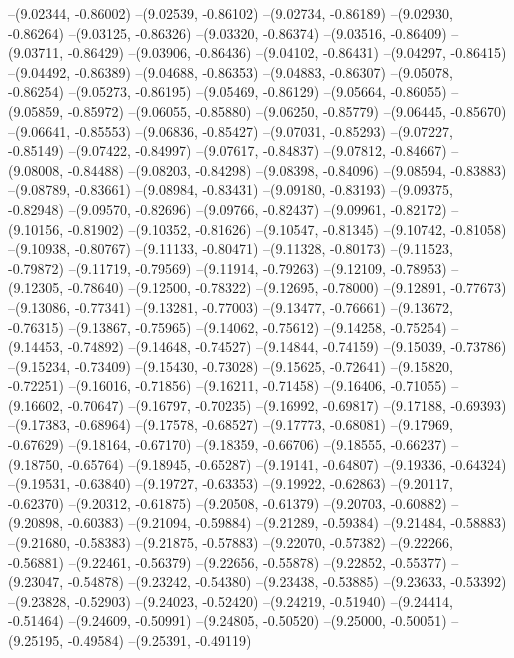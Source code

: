 --(9.02344, -0.86002)
--(9.02539, -0.86102)
--(9.02734, -0.86189)
--(9.02930, -0.86264)
--(9.03125, -0.86326)
--(9.03320, -0.86374)
--(9.03516, -0.86409)
--(9.03711, -0.86429)
--(9.03906, -0.86436)
--(9.04102, -0.86431)
--(9.04297, -0.86415)
--(9.04492, -0.86389)
--(9.04688, -0.86353)
--(9.04883, -0.86307)
--(9.05078, -0.86254)
--(9.05273, -0.86195)
--(9.05469, -0.86129)
--(9.05664, -0.86055)
--(9.05859, -0.85972)
--(9.06055, -0.85880)
--(9.06250, -0.85779)
--(9.06445, -0.85670)
--(9.06641, -0.85553)
--(9.06836, -0.85427)
--(9.07031, -0.85293)
--(9.07227, -0.85149)
--(9.07422, -0.84997)
--(9.07617, -0.84837)
--(9.07812, -0.84667)
--(9.08008, -0.84488)
--(9.08203, -0.84298)
--(9.08398, -0.84096)
--(9.08594, -0.83883)
--(9.08789, -0.83661)
--(9.08984, -0.83431)
--(9.09180, -0.83193)
--(9.09375, -0.82948)
--(9.09570, -0.82696)
--(9.09766, -0.82437)
--(9.09961, -0.82172)
--(9.10156, -0.81902)
--(9.10352, -0.81626)
--(9.10547, -0.81345)
--(9.10742, -0.81058)
--(9.10938, -0.80767)
--(9.11133, -0.80471)
--(9.11328, -0.80173)
--(9.11523, -0.79872)
--(9.11719, -0.79569)
--(9.11914, -0.79263)
--(9.12109, -0.78953)
--(9.12305, -0.78640)
--(9.12500, -0.78322)
--(9.12695, -0.78000)
--(9.12891, -0.77673)
--(9.13086, -0.77341)
--(9.13281, -0.77003)
--(9.13477, -0.76661)
--(9.13672, -0.76315)
--(9.13867, -0.75965)
--(9.14062, -0.75612)
--(9.14258, -0.75254)
--(9.14453, -0.74892)
--(9.14648, -0.74527)
--(9.14844, -0.74159)
--(9.15039, -0.73786)
--(9.15234, -0.73409)
--(9.15430, -0.73028)
--(9.15625, -0.72641)
--(9.15820, -0.72251)
--(9.16016, -0.71856)
--(9.16211, -0.71458)
--(9.16406, -0.71055)
--(9.16602, -0.70647)
--(9.16797, -0.70235)
--(9.16992, -0.69817)
--(9.17188, -0.69393)
--(9.17383, -0.68964)
--(9.17578, -0.68527)
--(9.17773, -0.68081)
--(9.17969, -0.67629)
--(9.18164, -0.67170)
--(9.18359, -0.66706)
--(9.18555, -0.66237)
--(9.18750, -0.65764)
--(9.18945, -0.65287)
--(9.19141, -0.64807)
--(9.19336, -0.64324)
--(9.19531, -0.63840)
--(9.19727, -0.63353)
--(9.19922, -0.62863)
--(9.20117, -0.62370)
--(9.20312, -0.61875)
--(9.20508, -0.61379)
--(9.20703, -0.60882)
--(9.20898, -0.60383)
--(9.21094, -0.59884)
--(9.21289, -0.59384)
--(9.21484, -0.58883)
--(9.21680, -0.58383)
--(9.21875, -0.57883)
--(9.22070, -0.57382)
--(9.22266, -0.56881)
--(9.22461, -0.56379)
--(9.22656, -0.55878)
--(9.22852, -0.55377)
--(9.23047, -0.54878)
--(9.23242, -0.54380)
--(9.23438, -0.53885)
--(9.23633, -0.53392)
--(9.23828, -0.52903)
--(9.24023, -0.52420)
--(9.24219, -0.51940)
--(9.24414, -0.51464)
--(9.24609, -0.50991)
--(9.24805, -0.50520)
--(9.25000, -0.50051)
--(9.25195, -0.49584)
--(9.25391, -0.49119)
